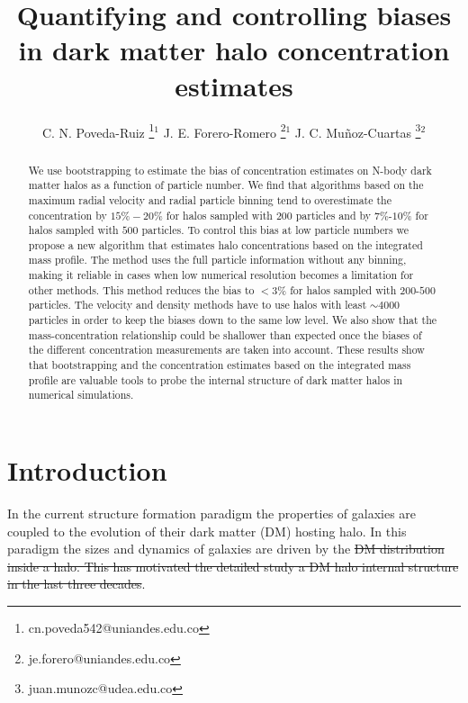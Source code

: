 \documentclass{emulateapj}
\providecommand{\DIFadd}[1]{{\protect\color{blue}\uwave{#1}}} %
\providecommand{\DIFdel}[1]{{\protect\color{red}\sout{#1}}}                      %
\providecommand{\DIFaddbegin}{} %
\providecommand{\DIFaddend}{} %
\providecommand{\DIFdelbegin}{} %
\providecommand{\DIFdelend}{} %
\begin{document}
\title{Quantifying and controlling biases in dark matter halo concentration estimates}
\author{
  C. N. Poveda-Ruiz \thanks{cn.poveda542@uniandes.edu.co}$^{1}$
  J. E. Forero-Romero \thanks{je.forero@uniandes.edu.co}$^{1}$
  J. C. Mu\~noz-Cuartas \thanks{juan.munozc@udea.edu.co}$^{2}$
}




\begin{abstract}
We use bootstrapping to estimate the bias of concentration estimates
on N-body dark matter halos as a function of particle number.  We find
that algorithms based on the maximum radial velocity and radial
particle binning tend to overestimate the concentration by $15\%-20\%$
for halos sampled with $200$ particles and by $7\%$-$10\%$ for halos
sampled with $500$ particles.  To control this bias at low particle
numbers we propose a new algorithm that estimates halo concentrations
based on the integrated mass profile.  The method uses the full
particle information without any binning, making it reliable in cases
when low numerical resolution becomes a limitation for other methods.
This method reduces the bias to $< 3\%$ for halos sampled with
$200$-$500$ particles.  The velocity and density methods have to use
halos with \DIFaddbegin \DIFadd{at }\DIFaddend least $\sim 4000$ particles in order to keep the biases
down to the same low level.  We also show that the mass-concentration
relationship could be shallower than expected once the biases of the
different concentration measurements are taken into account.  These
results show that bootstrapping and the concentration estimates based
on the integrated mass profile are valuable tools to probe the
internal structure of dark matter halos in numerical simulations.
\end{abstract}



\section{Introduction}
\label{sec:introduction}
In the current structure formation paradigm the properties of galaxies
are coupled to the evolution of their dark matter (DM) hosting halo.
In this paradigm the sizes and dynamics of galaxies are driven by
the \DIFdelbegin \DIFdel{DM distribution inside a halo. This has motivated the detailed study
a DM halo internal structure in the last three decades}\DIFdelend \DIFaddbegin \DIFadd{halo internal DM distribution}\DIFaddend . 
\end{document}
